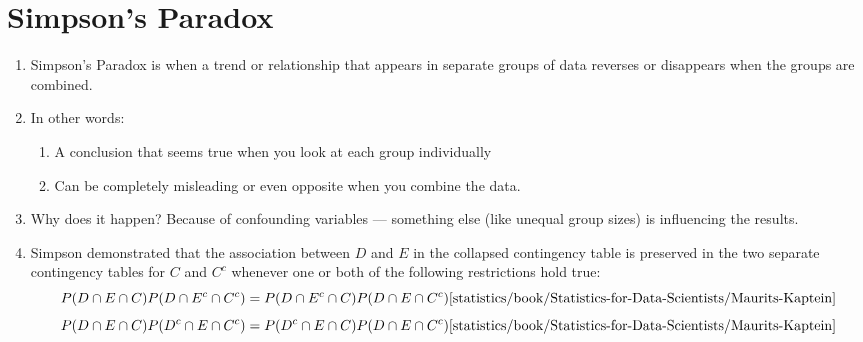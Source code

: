 


















\section{Simpson’s Paradox}

\begin{enumerate}
    \item Simpson’s Paradox is when a trend or relationship that appears in separate groups of data reverses or disappears when the groups are combined.
    \hfill \cite{common/online/chatgpt}

    \item In other words:
    \begin{enumerate}
        \item A conclusion that seems true when you look at each group individually
        \hfill \cite{common/online/chatgpt}

        \item Can be completely misleading or even opposite when you combine the data.
        \hfill \cite{common/online/chatgpt}
    \end{enumerate}

    \item Why does it happen? Because of confounding variables — something else (like unequal group sizes) is influencing the results.
    \hfill \cite{common/online/chatgpt}

    \item Simpson demonstrated that the association between $D$ and $E$ in the collapsed contingency table is preserved in the two separate contingency tables for $C$ and $C^c$ whenever one or both of the following restrictions hold true:
    \[
        P (D \cap  E \cap  C) P (D \cap  E^c \cap  C^c) = P (D \cap  E^c \cap  C) P (D \cap  E \cap  C^c)
        \hfill \text{\cite{statistics/book/Statistics-for-Data-Scientists/Maurits-Kaptein}}
    \]
    \[
        P (D \cap  E \cap  C) P(D^c \cap  E \cap  C^c)= P(D^c \cap  E \cap  C)P(D \cap  E \cap  C^c)
        \hfill \text{\cite{statistics/book/Statistics-for-Data-Scientists/Maurits-Kaptein}}
    \]


\end{enumerate}
